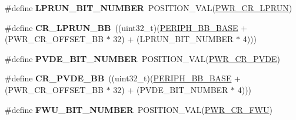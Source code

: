 \begin{DoxyCompactItemize}
\item 
\hypertarget{group___p_w_r___c_r__register__alias_gaeb5601613b8ff1f9cf0dc8d49a14bd6f}{\#define {\bfseries L\-P\-R\-U\-N\-\_\-\-B\-I\-T\-\_\-\-N\-U\-M\-B\-E\-R}~P\-O\-S\-I\-T\-I\-O\-N\-\_\-\-V\-A\-L(\hyperlink{group___peripheral___registers___bits___definition_gad420341e83bf995a581a42b49511e2ad}{P\-W\-R\-\_\-\-C\-R\-\_\-\-L\-P\-R\-U\-N})}\label{group___p_w_r___c_r__register__alias_gaeb5601613b8ff1f9cf0dc8d49a14bd6f}

\item 
\hypertarget{group___p_w_r___c_r__register__alias_ga5a4aa5b9e635f9af2cc3678a11014fe9}{\#define {\bfseries C\-R\-\_\-\-L\-P\-R\-U\-N\-\_\-\-B\-B}~((uint32\-\_\-t)(\hyperlink{group___peripheral__memory__map_gaed7efc100877000845c236ccdc9e144a}{P\-E\-R\-I\-P\-H\-\_\-\-B\-B\-\_\-\-B\-A\-S\-E} + (P\-W\-R\-\_\-\-C\-R\-\_\-\-O\-F\-F\-S\-E\-T\-\_\-\-B\-B $\ast$ 32) + (L\-P\-R\-U\-N\-\_\-\-B\-I\-T\-\_\-\-N\-U\-M\-B\-E\-R $\ast$ 4)))}\label{group___p_w_r___c_r__register__alias_ga5a4aa5b9e635f9af2cc3678a11014fe9}

\item 
\hypertarget{group___p_w_r___c_r__register__alias_gae731170c1675c5471fc06501228905b0}{\#define {\bfseries P\-V\-D\-E\-\_\-\-B\-I\-T\-\_\-\-N\-U\-M\-B\-E\-R}~P\-O\-S\-I\-T\-I\-O\-N\-\_\-\-V\-A\-L(\hyperlink{group___peripheral___registers___bits___definition_ga05d5c39759e69a294c0ab9bea8f142e5}{P\-W\-R\-\_\-\-C\-R\-\_\-\-P\-V\-D\-E})}\label{group___p_w_r___c_r__register__alias_gae731170c1675c5471fc06501228905b0}

\item 
\hypertarget{group___p_w_r___c_r__register__alias_ga49f51ef8285a6be76fd204d49a00709c}{\#define {\bfseries C\-R\-\_\-\-P\-V\-D\-E\-\_\-\-B\-B}~((uint32\-\_\-t)(\hyperlink{group___peripheral__memory__map_gaed7efc100877000845c236ccdc9e144a}{P\-E\-R\-I\-P\-H\-\_\-\-B\-B\-\_\-\-B\-A\-S\-E} + (P\-W\-R\-\_\-\-C\-R\-\_\-\-O\-F\-F\-S\-E\-T\-\_\-\-B\-B $\ast$ 32) + (P\-V\-D\-E\-\_\-\-B\-I\-T\-\_\-\-N\-U\-M\-B\-E\-R $\ast$ 4)))}\label{group___p_w_r___c_r__register__alias_ga49f51ef8285a6be76fd204d49a00709c}

\item 
\hypertarget{group___p_w_r___c_r__register__alias_ga7b40f7484fbb6ae8366c4504e5d06444}{\#define {\bfseries F\-W\-U\-\_\-\-B\-I\-T\-\_\-\-N\-U\-M\-B\-E\-R}~P\-O\-S\-I\-T\-I\-O\-N\-\_\-\-V\-A\-L(\hyperlink{group___peripheral___registers___bits___definition_ga282ffe109edf2466c2a563784a591ec8}{P\-W\-R\-\_\-\-C\-R\-\_\-\-F\-W\-U})}\label{group___p_w_r___c_r__register__alias_ga7b40f7484fbb6ae8366c4504e5d06444}


\end{DoxyCompactItemize}
